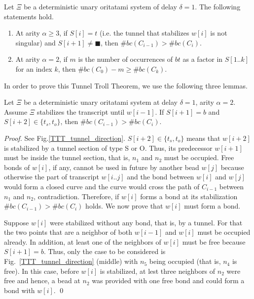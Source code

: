 

\begin{theorem}
\label{TTT}
Let $\Xi$ be a deterministic unary oritatami system of delay $\delta = 1$. The following statements hold.
\begin{enumerate}
\item At arity $\alpha \geq 3$, if $S[i] = t$ (i.e. the tunnel that stabilizes $w[i]$ is not singular) and $S[i+1] \neq \blacksquare$, then $\#bc(C_{i-1}) > \#bc(C_i)$.
\item At arity $\alpha = 2$, if $m$ is the number of occurrences of $bt$ as a factor in $S[1..k]$ for an index $k$, then $\#bc(C_{0}) - m \geq \#bc(C_{k})$.
\end{enumerate}
\end{theorem}

In order to prove this Tunnel Troll Theorem, we use the following three lemmas.


\begin{lemma}
\label{TTT_entrance_Tab}
Let $\Xi$ be a deterministic unary oritatami system at delay $\delta = 1$, arity $\alpha =2$. 
Assume $\Xi$ stabilizes the transcript until $w[i-1]$. If $S[i+1] = b$ and $S[i+2] \in \{ t_s, t_o \} $, then $\#bc(C_{i-1}) > \#bc(C_{i})$.
\end{lemma}

\begin{proof}%
See Fig.\ref{TTT_tunnel_direction}.
$S[i+2] \in \{ t_s, t_o \} $ means that $w[i+2]$ is stabilized by a tunnel section of type S or O.
Thus,  its predecessor $w[i+1]$ must be inside the tunnel section, that is, $n_1$ and $n_2$ must be occupied.
Free bonds of $w[i]$, if any, cannot be used in future by another bead $w[j]$ because otherwise the part of transcript $w[i..j]$ and the bond between $w[i]$ and $w[j]$ would form a closed curve and the curve would cross the path of $C_{i-1}$ between $n_1$ and $n_2$, contradiction.
Therefore, if $w[i]$ forms a bond at its stabilization $\#bc(C_{i-1}) > \#bc(C_{i})$ holds.
We now prove that $w[i]$ must form a bond.


Suppose $w[i]$ were stabilized without any bond, that is, by a tunnel.
For that the two points that are a neighbor of both $w[i-1]$ and $w[i]$ must be occupied already.
In addition, at least one of the neighbors of $w[i]$ must be free because $S[i+1] = b$.
Thus, only the case to be considered is Fig.~\ref{TTT_tunnel_direction} (middle) with $n_5$ being occupied (that is, $n_4$ is free).
In this case, before $w[i]$ is stabilized, at lest three neighbors of $n_2$ were free and hence, a bead at $n_2$ was provided with one free bond and could form a bond with $w[i]$. \qed

\end{proof}

